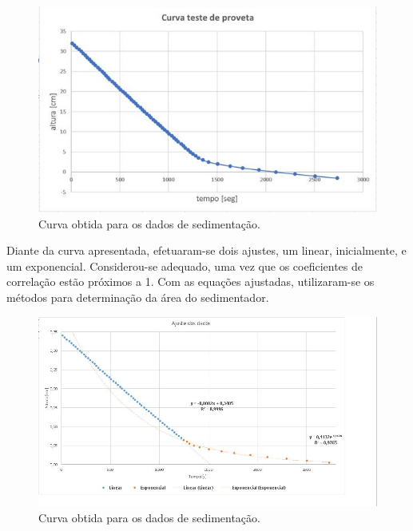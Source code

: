 \begin{figure}[H]
	\begin{center}
		\includegraphics[scale=.9,trim={0 0 0 0}]{figuras/ladeq/sedi/alturatempo}
		\caption{Curva obtida para os dados de sedimentação.}
		\label{tabqua1}
	\end{center}
\end{figure}


Diante da curva apresentada, efetuaram-se dois ajustes, um linear, inicialmente, e um exponencial. Considerou-se adequado, uma vez que os coeficientes de correlação estão próximos a 1. Com as equações ajustadas, utilizaram-se os métodos para determinação da área do sedimentador. 

\begin{figure}[H]
	\begin{center}
		\includegraphics[scale=.7,trim={0 0 0 0}]{figuras/ladeq/sedi/ajuste}
		\caption{Curva obtida para os dados de sedimentação.}
		\label{tabqua1}
	\end{center}
\end{figure}


